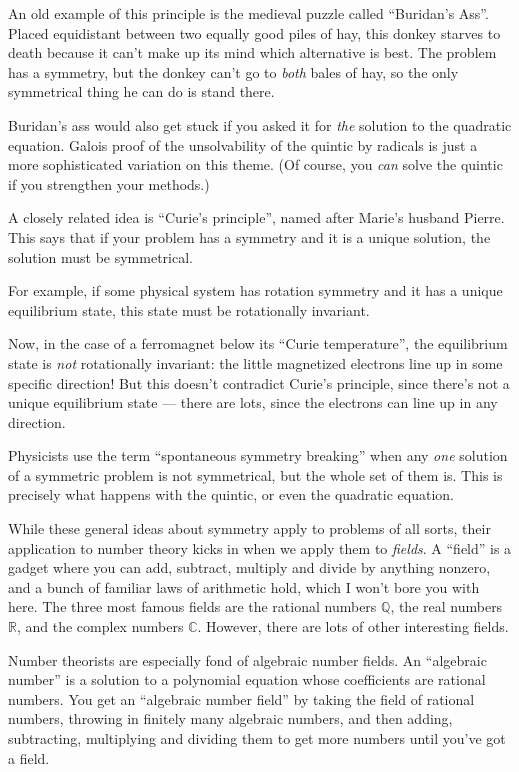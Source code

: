 \documentclass{article}
\begin{document}
An old example of this principle is the medieval puzzle called
``Buridan's Ass''. Placed equidistant between two equally good piles of
hay, this donkey starves to death because it can't make up its mind
which alternative is best. The problem has a symmetry, but the donkey
can't go to \emph{both} bales of hay, so the only symmetrical thing he
can do is stand there.

Buridan's ass would also get stuck if you asked it for \emph{the}
solution to the quadratic equation. Galois proof of the unsolvability of
the quintic by radicals is just a more sophisticated variation on this
theme. (Of course, you \emph{can} solve the quintic if you strengthen
your methods.)

A closely related idea is ``Curie's principle'', named after Marie's
husband Pierre. This says that if your problem has a symmetry and it is
a unique solution, the solution must be symmetrical.

For example, if some physical system has rotation symmetry and it has a
unique equilibrium state, this state must be rotationally invariant.

Now, in the case of a ferromagnet below its ``Curie temperature'', the
equilibrium state is \emph{not} rotationally invariant: the little
magnetized electrons line up in some specific direction! But this
doesn't contradict Curie's principle, since there's not a unique
equilibrium state --- there are lots, since the electrons can line up in
any direction.

Physicists use the term ``spontaneous symmetry breaking'' when any
\emph{one} solution of a symmetric problem is not symmetrical, but the
whole set of them is. This is precisely what happens with the quintic,
or even the quadratic equation.

While these general ideas about symmetry apply to problems of all sorts,
their application to number theory kicks in when we apply them to
\emph{fields}. A ``field'' is a gadget where you can add, subtract,
multiply and divide by anything nonzero, and a bunch of familiar laws of
arithmetic hold, which I won't bore you with here. The three most famous
fields are the rational numbers \(\mathbb{Q}\), the real numbers
\(\mathbb{R}\), and the complex numbers \(\mathbb{C}\). However, there
are lots of other interesting fields.

Number theorists are especially fond of algebraic number fields. An
``algebraic number'' is a solution to a polynomial equation whose
coefficients are rational numbers. You get an ``algebraic number field''
by taking the field of rational numbers, throwing in finitely many
algebraic numbers, and then adding, subtracting, multiplying and
dividing them to get more numbers until you've got a field.
\end{document}
